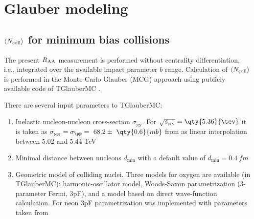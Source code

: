 \chapter{Glauber modeling}\label{chap:glauber}

\section{$\langle N_{\text{coll}}\rangle$ for minimum bias collisions}\label{sec:ncoll_glauber}
The present $\RAA$ measurement is performed without centrality differentiation, i.e., integrated over the available impact parameter $b$ range. Calculation of $\langle N_{\text{coll}}\rangle$ is performed in the Monte-Carlo Glauber (MCG) approach using publicly available code of TGlauberMC \cite{alver2008phobosglaubermontecarlo, PhysRevC.97.054910}.

There are several input parameters to TGlauberMC:
\begin{enumerate}
    \item Inelastic nucleon-nucleon cross-section $\sigma_{_\mathrm{NN}}$. For $\sqn = \qty{5.36}{\tev}$ it is taken as $\sigma_{_\mathrm{NN}}= \sigma_{\pp} =~68.2\pm~\qty{0.6}{mb}$ from \cite{PhysRevC.97.054910} as linear interpolation between 5.02 and 5.44 TeV
    \item Minimal distance between nucleons $d_\text{min}$ with a default value of $d_\text{min} = \qty{0.4}{fm}$ %
    \item Geometric model of colliding nuclei. Three models for oxygen are available (in TGlauberMC): harmonic-oscillator model, Woods-Saxon parametrization (3-parameter Fermi, 3pF), and a model based on direct wave-function calculation. For neon 3pF parametrization was implemented with parameters taken from \cite{DEVRIES1987495}
\end{enumerate}

